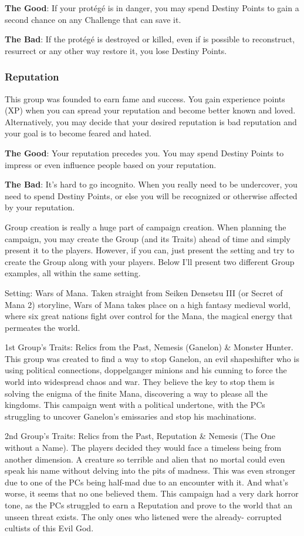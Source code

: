 \textbf{The Good}: If your protégé is in danger, you
may spend Destiny Points to gain a second chance
on any Challenge that can save it.

\textbf{The Bad}: If the protégé is destroyed or
killed, even if is possible to reconstruct, resurrect
or any other way restore it, you lose Destiny Points.

\subsubsection{Reputation}
This group was founded to earn fame and
success. You gain experience points (XP) when you
can spread your reputation and become better
known and loved. Alternatively, you may decide
that your desired reputation is bad reputation and
your goal is to become feared and hated.

\textbf{The Good}: Your reputation precedes you.
You may spend Destiny Points to impress or even
influence people based on your reputation.

\textbf{The Bad}: It's hard to go incognito. When
you really need to be undercover, you need to
spend Destiny Points, or else you will be
recognized or otherwise affected by your
reputation.

Group creation is really a huge part of campaign
creation. When planning the campaign, you may create
the Group (and its Traits) ahead of time and simply
present it to the players. However, if you can, just present
the setting and try to create the Group along with your
players. Below I'll present two different Group examples,
all within the same setting.

Setting: Wars of Mana. Taken straight from Seiken
Densetsu III (or Secret of Mana 2) storyline, Wars of
Mana takes place on a high fantasy medieval world, where
six great nations fight over control for the Mana, the
magical energy that permeates the world.

1st Group's Traits: Relics from the Past, Nemesis
(Ganelon) \& Monster Hunter. This group was created to
find a way to stop Ganelon, an evil shapeshifter who is
using political connections, doppelganger minions and his
cunning to force the world into widespread chaos and war.
They believe the key to stop them is solving the enigma
of the finite Mana, discovering a way to please all the
kingdoms. This campaign went with a political undertone,
with the PCs struggling to uncover Ganelon's emissaries
and stop his machinations.

2nd Group's Traits: Relics from the Past, Reputation
\& Nemesis (The One without a Name). The players
decided they would face a timeless being from another
dimension. A creature so terrible and alien that no mortal
could even speak his name without delving into the pits
of madness. This was even stronger due to one of the PCs
being half-mad due to an encounter with it. And what’s
worse, it seems that no one believed them. This campaign
had a very dark horror tone, as the PCs struggled to earn
a Reputation and prove to the world that an unseen threat
exists. The only ones who listened were the already-
corrupted cultists of this Evil God.

